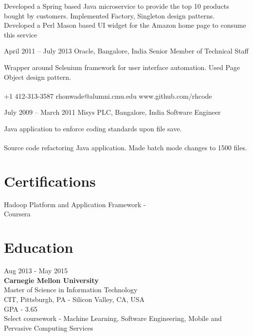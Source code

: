 \documentclass{tccv}
\begin{document}
\begin{eventlist}
Developed a Spring based Java microservice to provide the top 10 products bought by customers. Implemented Factory, Singleton design patterns.\\

Developed a Perl Mason based UI widget for the Amazon home page to consume this service

\item{April 2011 -- July 2013}
     {Oracle, Bangalore, India}
     {Senior Member of Technical Staff}

Wrapper around Selenium framework for user interface automation. Used Page Object design pattern.\\
\\

    {+1 412-313-3587}
    {rhonwade@alumni.cmu.edu}
    {www.github.com/rhcode}

\item{July 2009 -- March 2011}
     {Misys PLC, Bangalore, India}
     {Software Engineer}

Java application to enforce coding standards upon file save.\\
\\

Source code refactoring Java application. Made batch mode changes to 1500 files.\\
\end{eventlist}

\vspace{-0.2in}
\section{Certifications}
Hadoop Platform and Application Framework - \\Coursera

\section{Education}

{\hfill\sc Aug 2013 - May 2015}\\
\textbf{Carnegie Mellon University}\\ 
Master of Science in Information Technology\\
CIT, Pittsburgh, PA - Silicon Valley, CA, USA\\
GPA - 3.65\\
Select coursework - Machine Learning, Software Engineering, Mobile and Pervasive Computing Services\\
\end{document}
